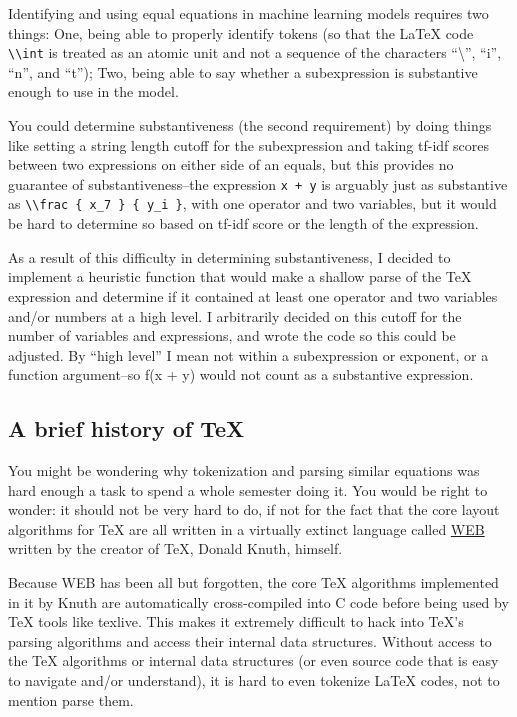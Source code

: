 \documentclass[]{article}
\begin{document}
Identifying and using equal equations in machine learning models
requires two things: One, being able to properly identify tokens (so
that the LaTeX code \texttt{\textbackslash{}\textbackslash{}int} is
treated as an atomic unit and not a sequence of the characters
``\textbackslash{}'', ``i'', ``n'', and ``t''); Two, being able to say
whether a subexpression is substantive enough to use in the model.

You could determine substantiveness (the second requirement) by doing
things like setting a string length cutoff for the subexpression and
taking tf-idf scores between two expressions on either side of an
equals, but this provides no guarantee of substantiveness--the
expression \texttt{x\ +\ y} is arguably just as substantive as
\texttt{\textbackslash{}\textbackslash{}frac\ \{\ x\_7\ \}\ \{\ y\_i\ \}},
with one operator and two variables, but it would be hard to determine
so based on tf-idf score or the length of the expression.

As a result of this difficulty in determining substantiveness, I decided
to implement a heuristic function that would make a shallow parse of the
TeX expression and determine if it contained at least one operator and
two variables and/or numbers at a high level. I arbitrarily decided on
this cutoff for the number of variables and expressions, and wrote the
code so this could be adjusted. By ``high level'' I mean not within a
subexpression or exponent, or a function argument--so f(x + y) would not
count as a substantive expression.

\hypertarget{a-brief-history-of-tex}{%
\subsection{A brief history of TeX}\label{a-brief-history-of-tex}}

You might be wondering why tokenization and parsing similar equations
was hard enough a task to spend a whole semester doing it. You would be
right to wonder: it should not be very hard to do, if not for the fact
that the core layout algorithms for TeX are all written in a virtually
extinct language called \href{https://en.wikipedia.org/wiki/WEB}{WEB}
written by the creator of TeX, Donald Knuth, himself.

Because WEB has been all but forgotten, the core TeX algorithms
implemented in it by Knuth are automatically cross-compiled into C code
before being used by TeX tools like texlive. This makes it extremely
difficult to hack into TeX's parsing algorithms and access their
internal data structures. Without access to the TeX algorithms or
internal data structures (or even source code that is easy to navigate
and/or understand), it is hard to even tokenize LaTeX codes, not to
mention parse them.
\end{document}
